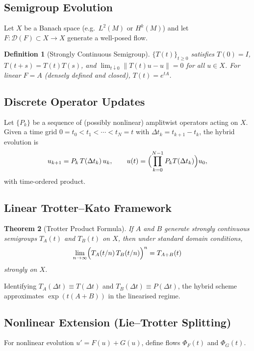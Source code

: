 \documentclass[12pt, a4paper]{article}
\newtheorem{theorem}{Theorem}[section]
\newtheorem{definition}[theorem]{Definition}
\theoremstyle{remark}
\theoremstyle{definition}
\begin{document}
\subsection{Semigroup Evolution}

Let $X$ be a Banach space (e.g.\ $L^2(M)$ or $H^k(M)$) and let $F\colon\mathcal{D}(F)
\subset X \to X$ generate a well-posed flow.

\begin{definition}[Strongly Continuous Semigroup]
$\{T(t)\}_{t\ge 0}$ satisfies $T(0) = I$, $T(t+s) = T(t)T(s)$, and
$\lim_{t\downarrow 0}\|T(t)u - u\| = 0$ for all $u \in X$.
For linear $F = A$ (densely defined and closed), $T(t) = e^{tA}$.
\end{definition}

\subsection{Discrete Operator Updates}

Let $\{P_k\}$ be a sequence of (possibly nonlinear) amplitwist operators acting on $X$.
Given a time grid $0 = t_0 < t_1 < \cdots < t_N = t$ with $\Delta t_k = t_{k+1} - t_k$,
the hybrid evolution is
\[
u_{k+1} = P_k\,T(\Delta t_k)\,u_k, \qquad
u(t) = \Bigl(\prod_{k=0}^{N-1} P_k T(\Delta t_k)\Bigr)u_0,
\]
with time-ordered product.

\subsection{Linear Trotter--Kato Framework}

\begin{theorem}[Trotter Product Formula]
If $A$ and $B$ generate strongly continuous semigroups $T_A(t)$ and $T_B(t)$ on $X$, then
under standard domain conditions,
\[
\lim_{n\to\infty}\Bigl(T_A(t/n)\,T_B(t/n)\Bigr)^n = T_{A+B}(t)
\]
strongly on $X$.
\end{theorem}

Identifying $T_A(\Delta t) \equiv T(\Delta t)$ and $T_B(\Delta t) \equiv P(\Delta t)$, the
hybrid scheme approximates $\exp(t(A+B))$ in the linearised regime.

\subsection{Nonlinear Extension (Lie--Trotter Splitting)}

For nonlinear evolution $u' = F(u) + G(u)$, define flows $\Phi_F(t)$ and $\Phi_G(t)$.
\end{document}

